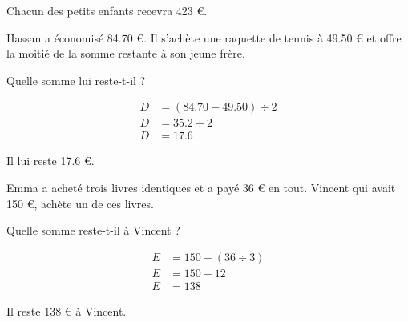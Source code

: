 \begin{questions}
\begin{solution}
		Chacun des petits enfants recevra 423 €.
	\end{solution}
	
	
	\question[1\half] Hassan a économisé \num{84.70} €. Il s'achète une raquette de tennis à \num{49.50} € et offre la moitié de la somme restante à son jeune frère. 
	
	Quelle somme lui reste-t-il ?
	
	\begin{solution}
		\begin{align*}
			D &= (\num{84.70} - \num{49.50}) \div 2 \\
			D &= \num{35.2} \div 2 \\
			D &= \num{17.6} 
		\end{align*}
		
		Il lui reste \num{17.6} €.
	\end{solution}
	
	\question[1\half] Emma a acheté trois livres identiques et a payé 36 € en tout. Vincent qui avait 150 €, achète un de ces livres. 
	
	Quelle somme reste-t-il à Vincent ?
	
	\begin{solution}
		\begin{align*}
			E &= 150 - (36 \div 3) \\
			E &= 150 - 12 \\
			E &= 138
		\end{align*}
	
		
		Il reste 138 € à Vincent.
		
	\end{solution}
	
%		
%		
\end{questions}